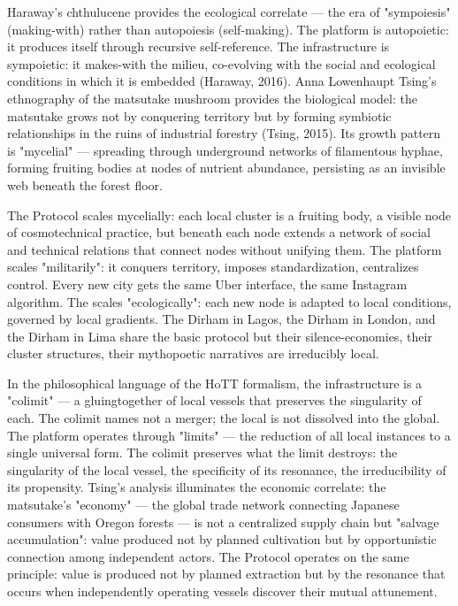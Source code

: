 Haraway's chthulucene provides the ecological correlate — the era of "sympoiesis" (making-with) rather than autopoiesis (self-making). The platform is autopoietic: it produces itself through recursive self-reference. The  infrastructure is sympoietic: it makes-with the milieu, co-evolving with the social and ecological conditions in which it is embedded (Haraway, 2016). Anna Lowenhaupt Tsing's ethnography of the matsutake mushroom provides the biological model: the matsutake grows not by conquering territory but by forming symbiotic relationships in the ruins of industrial forestry (Tsing, 2015). Its growth pattern is "mycelial" — spreading through underground networks of filamentous hyphae, forming fruiting bodies at nodes of nutrient abundance, persisting as an invisible web beneath the forest floor.

The  Protocol scales mycelially: each local cluster is a fruiting body, a visible node of cosmotechnical practice, but beneath each node extends a network of social and technical relations that connect nodes without unifying them. The platform scales "militarily": it conquers territory, imposes standardization, centralizes control. Every new city gets the same Uber interface, the same Instagram algorithm. The  scales "ecologically": each new node is adapted to local conditions, governed by local gradients. The Dirham in Lagos, the Dirham in London, and the Dirham in Lima share the basic protocol but their silence-economies, their cluster structures, their mythopoetic narratives are irreducibly local.

In the philosophical language of the HoTT formalism, the  infrastructure is a "colimit" — a gluingtogether of local vessels that preserves the singularity of each. The colimit names not a merger; the local is not dissolved into the global. The platform operates through "limits" — the reduction of all local instances to a single universal form. The colimit preserves what the limit destroys: the singularity of the local vessel, the specificity of its resonance, the irreducibility of its propensity. Tsing's analysis illuminates the economic correlate: the matsutake's "economy" — the global trade network connecting Japanese consumers with Oregon forests — is not a centralized supply chain but "salvage accumulation": value produced not by planned cultivation but by opportunistic connection among independent actors. The  Protocol operates on the same principle: value is produced not by planned extraction but by the resonance that occurs when independently operating vessels discover their mutual attunement.

